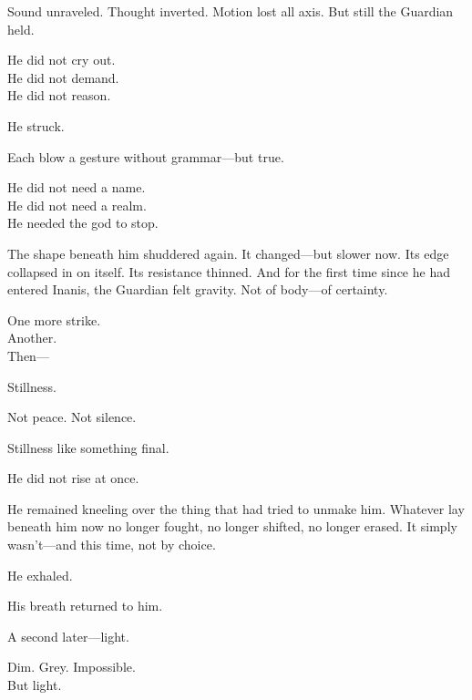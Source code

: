 \documentclass[9pt]{article}
\begin{document}
\vspace{0.5em}
Sound unraveled. Thought inverted. Motion lost all axis. But still the Guardian held.

\vspace{0.5em}
He did not cry out.\\
He did not demand.\\
He did not reason.

\vspace{0.5em}
He struck.

\vspace{0.5em}
Each blow a gesture without grammar---but true.

\vspace{0.5em}
He did not need a name.\\
He did not need a realm.\\
He needed the god to stop.

\vspace{0.5em}
The shape beneath him shuddered again. It changed---but slower now. Its edge collapsed in on itself. Its resistance thinned. And for the first time since he had entered Inanis, the Guardian felt gravity. Not of body---of certainty.

\vspace{0.5em}
One more strike.\\
Another.\\
Then---

\vspace{0.5em}
Stillness.

\vspace{0.5em}
Not peace. Not silence.

\vspace{0.5em}
Stillness like something final.

\vspace{0.5em}
He did not rise at once.

\vspace{0.5em}
He remained kneeling over the thing that had tried to unmake him. Whatever lay beneath him now no longer fought, no longer shifted, no longer erased. It simply wasn’t---and this time, not by choice.

\vspace{0.5em}
He exhaled.

\vspace{0.5em}
His breath returned to him.

\vspace{0.5em}
A second later---light.

\vspace{0.5em}
Dim. Grey. Impossible.\\
But light.
\end{document}
